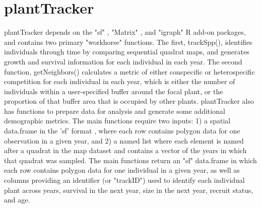 \documentclass[12pt, letterpaper]{article}
\begin{document}
\section{plantTracker}
plantTracker depends on the "sf" \cite{Pebesma2018}, "Matrix" \cite{Bates2019Matrix:Methods}, and "igraph" \cite{Csardi2006TheResearch} R add-on packages, and contains two primary "workhorse" functions. The first, trackSpp(), identifies individuals through time by comparing sequential quadrat maps, and generates growth and survival information for each individual in each year. The second function, getNeighbors() calculates a metric of either conspecific or heterospecific competition for each individual in each year, which is either the number of individuals within a user-specified buffer around the focal plant, or the proportion of that buffer area that is occupied by other plants. plantTracker also has functions to prepare data for analysis and generate some additional demographic metrics. The main functions require two inputs: 1) a spatial data.frame in the 'sf' format \cite{Pebesma2018}, where each row contains polygon data for one observation in a given year, and 2) a named list where each element is named after a quadrat in the map dataset and contains a vector of the years in which that quadrat was sampled. The main functions return an "sf" data.frame in which each row contains polygon data for one individual in a given year, as well as columns providing an identifier (or "trackID") used to identify each individual plant across years, survival in the next year, size in the next year, recruit status, and age. 
\end{document}
